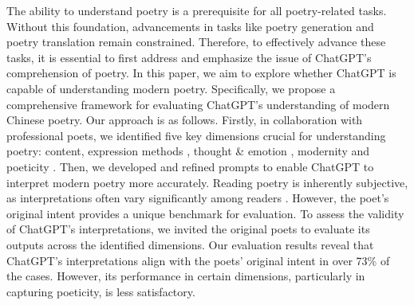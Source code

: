 \documentclass[11pt]{article}
\begin{document}

The ability to understand poetry \cite{tate1940understanding,pierce2003defining,mcgrath2018understating} is a prerequisite for all poetry-related tasks. Without this foundation, advancements in tasks like poetry generation \cite{manurung2004evolutionary,zhang2014chinese,yi2018automatic,van2020automatic} and poetry translation \cite{genzel2010poetic,ghazvininejad2018neural,chakrabarty2021don,song-etal-2023-towards} remain constrained. Therefore, to effectively advance these tasks, it is essential to first address and emphasize the issue of ChatGPT's comprehension of poetry. In this paper, we aim to explore whether ChatGPT is capable of understanding modern poetry. Specifically, we propose a comprehensive framework for evaluating ChatGPT's understanding of modern Chinese poetry. Our approach is as follows. Firstly, in collaboration with professional poets, we identified five key dimensions crucial for understanding poetry: content, expression methods \cite{yuhaizhang2001,wangguangming1998}, thought \& emotion \cite{XiYunshuTwoCharacteristics,Emotionalclassification,WangShuting2006,WangMi2019}, modernity \cite{ChengBo2005,LongQuanming2005,ZangDi1998} and poeticity \cite{wang-etal-2024-best}. Then, we developed and refined prompts to enable ChatGPT to interpret modern poetry more accurately. Reading poetry is inherently subjective, as interpretations often vary significantly among readers \cite{Brodsky1999WitnessandPleasure, JiangYongjun2012,ZhangTaozhou2022Problems}. However, the poet's original intent provides a unique benchmark for evaluation. To assess the validity of ChatGPT's interpretations, we invited the original poets to evaluate its outputs across the identified dimensions. Our evaluation results reveal that ChatGPT's interpretations align with the poets' original intent in over 73\% of the cases. However, its performance in certain dimensions, particularly in capturing poeticity, is less satisfactory. 


\end{document}
